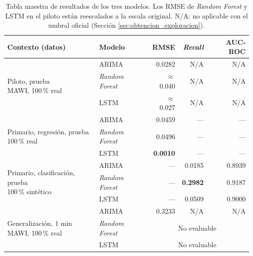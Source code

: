 \documentclass[12pt]{report}
\begin{document}
\begin{table}[H]
    \centering
    \small
    \setlength{\tabcolsep}{4pt}
    \begin{tabular}{|p{3.6cm}|l|r|r|r|}
        \hline
        \textbf{Contexto (datos)} & \textbf{Modelo} & \textbf{RMSE} & \textbf{\textit{Recall}} & \textbf{AUC-ROC} \\
        \hline
        \multirow{3}{3.6cm}{\raggedright Piloto, prueba \newline {\footnotesize MAWI, 100\,\% real}}
            & ARIMA & 0.0282 & N/A & N/A \\
            & \textit{Random Forest} & $\approx$ 0.040 & N/A & N/A \\
            & LSTM & $\approx$ 0.027 & N/A & N/A \\
        \hline
        \multirow{3}{3.6cm}{\raggedright Primario, regresión, prueba \newline {\footnotesize 100\,\% real}}
            & ARIMA & 0.0459 & --- & --- \\
            & \textit{Random Forest} & 0.0496 & --- & --- \\
            & LSTM & \textbf{0.0010} & --- & --- \\
        \hline
        \multirow{3}{3.6cm}{\raggedright Primario, clasificación, prueba \newline {\footnotesize 100\,\% sintético}}
            & ARIMA & --- & 0.0185 & 0.8939 \\
            & \textit{Random Forest} & --- & \textbf{0.2982} & 0.9187 \\
            & LSTM & --- & 0.0509 & 0.9000 \\
        \hline
        \multirow{3}{3.6cm}{\raggedright Generalización, 1 min \newline {\footnotesize MAWI, 100\,\% real}}
            & ARIMA & 0.3233 & N/A & N/A \\
            & \textit{Random Forest} & \multicolumn{3}{c|}{No evaluable} \\
            & LSTM & \multicolumn{3}{c|}{No evaluable} \\
        \hline
    \end{tabular}
    \caption{Tabla maestra de resultados de los tres modelos. Los RMSE de \textit{Random Forest} y LSTM en el piloto están reescalados a la escala original. N/A: no aplicable con el umbral oficial (Sección \ref{sec:obtencion_exploracion}).}
    \label{tab:tabla_maestra}
\end{table}
\end{document}

